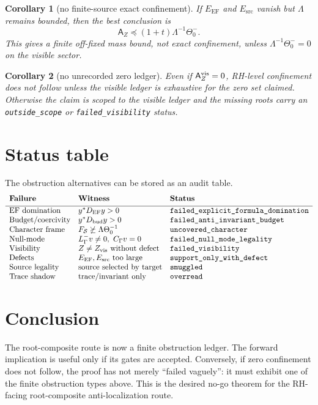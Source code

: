 \documentclass[11pt]{article}
\newtheorem{corollary}{Corollary}
\newcommand{\A}{\mathsf A}
\newcommand{\EF}{\mathrm{EF}}
\newcommand{\src}{\mathrm{src}}
\newcommand{\pre}{\preceq}
\begin{document}
\begin{corollary}[no finite-source exact confinement]
If $E_{\EF}$ and $E_{\src}$ vanish but $\Lambda$ remains bounded, then the best conclusion is
\[
\A_Z\pre (1+t)\Lambda^{-1}\Theta_0^-.
\]
This gives a finite off-fixed mass bound, not exact confinement, unless $\Lambda^{-1}\Theta_0^-=0$ on the visible sector.
\end{corollary}

\begin{corollary}[no unrecorded zero ledger]
Even if $\A_Z^{\rm vis}=0$, RH-level confinement does not follow unless the visible ledger is exhaustive for the zero set claimed.  Otherwise the claim is scoped to the visible ledger and the missing roots carry an \texttt{outside\_scope} or \texttt{failed\_visibility} status.
\end{corollary}

\section{Status table}

The obstruction alternatives can be stored as an audit table.
\[
\begin{array}{lll}
\textbf{Failure} & \textbf{Witness} & \textbf{Status}\\[3pt]
\hline
\text{EF domination} & y^*D_{\EF}y>0 & \texttt{failed\_explicit\_formula\_domination}\\
\text{Budget/coercivity} & y^*D_{\rm bud}y>0 & \texttt{failed\_anti\_invariant\_budget}\\
\text{Character frame} & F_{\mathcal S}\not\succeq\Lambda\Theta_0^{-1} & \texttt{uncovered\_character}\\
\text{Null-mode} & L^-_\Gamma v\ne0,\ C_\Gamma v=0 & \texttt{failed\_null\_mode\_legality}\\
\text{Visibility} & Z\ne Z_{\rm vis}\text{ without defect} & \texttt{failed\_visibility}\\
\text{Defects} & E_{\EF},E_{\src}\text{ too large} & \texttt{support\_only\_with\_defect}\\
\text{Source legality} & \text{source selected by target} & \texttt{smuggled}\\
\text{Trace shadow} & \text{trace/invariant only} & \texttt{overread}
\end{array}
\]

\section{Conclusion}

The root-composite route is now a finite obstruction ledger.  The forward implication is useful only if its gates are accepted.  Conversely, if zero confinement does not follow, the proof has not merely ``failed vaguely'': it must exhibit one of the finite obstruction types above.  This is the desired no-go theorem for the RH-facing root-composite anti-localization route.
\end{document}
